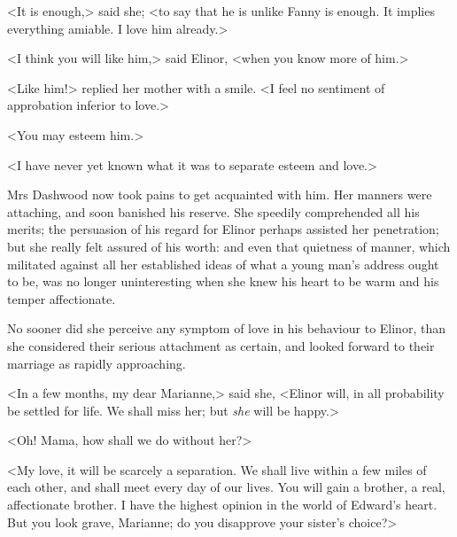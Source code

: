 <It is enough,> said she; <to say that he is unlike Fanny is enough. It implies everything amiable. I love him already.>

<I think you will like him,> said Elinor, <when you know more of him.>

<Like him!> replied her mother with a smile. <I feel no sentiment of approbation inferior to love.>

<You may esteem him.>

<I have never yet known what it was to separate esteem and love.>

Mrs Dashwood now took pains to get acquainted with him. Her manners were attaching, and soon banished his reserve. She speedily comprehended all his merits; the persuasion of his regard for Elinor perhaps assisted her penetration; but she really felt assured of his worth: and even that quietness of manner, which militated against all her established ideas of what a young man's address ought to be, was no longer uninteresting when she knew his heart to be warm and his temper affectionate.

No sooner did she perceive any symptom of love in his behaviour to Elinor, than she considered their serious attachment as certain, and looked forward to their marriage as rapidly approaching.

<In a few months, my dear Marianne,> said she, <Elinor will, in all probability be settled for life. We shall miss her; but \textit{she} will be happy.>

<Oh! Mama, how shall we do without her?>

<My love, it will be scarcely a separation. We shall live within a few miles of each other, and shall meet every day of our lives. You will gain a brother, a real, affectionate brother. I have the highest opinion in the world of Edward's heart. But you look grave, Marianne; do you disapprove your sister's choice?>

